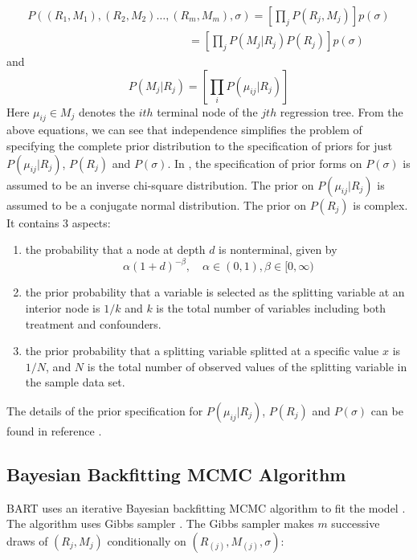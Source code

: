 \begin{equation*}
 \begin{array}{l}
P(({R_1},{M_1}),({R_2},{M_2}) \ldots ,({R_m},{M_m}),\sigma ) = \left[ {\prod\limits_j {P({R_j},{M_j})} } \right]p(\sigma )\\
\quad \quad \quad \quad \quad \quad \quad \quad \quad \quad \quad \quad \quad \quad \; = \left[ {\prod\limits_j {P({M_j}|{R_j})P({R_j})} } \right]p(\sigma )
\end{array}
 \end{equation*}
and
\begin{equation*}
P({M_j}|{R_j}) = \left[ {\prod\limits_i {P({\mu _{ij}}|{R_j})} } \right]
 \end{equation*}
Here ${\mu _{ij}} \in {M_j}$ denotes the $ith$ terminal node of the $jth$ regression tree. From the above equations, we can see that independence simplifies the problem of specifying the complete prior distribution to the specification of priors for just ${P({\mu _{ij}}|{R_j})}$, $P({R_j})$ and $P(\sigma)$. In \cite{chipman2010bart}, the specification of prior forms on $P(\sigma)$ is assumed to be an inverse chi-square distribution. The prior on ${P({\mu _{ij}}|{R_j})}$ is assumed to be a conjugate normal distribution. The prior on $P(R_j)$ is complex. It contains 3 aspects:
\begin{enumerate}
\item the probability that a node at depth $d$ is nonterminal, given by
\begin{equation*}
\alpha {(1 + d)^{ - \beta }},\quad \alpha  \in (0,1),\beta  \in [0,\infty )
 \end{equation*}
\item the prior probability that a variable is selected as the splitting variable at an interior node is $1/k$ and $k$ is the total number of variables including both treatment and confounders.
\item the prior probability that a splitting variable splitted at a specific value $x$ is $1/N$, and $N$ is the total number of observed values of the splitting variable in the sample data set.
\end{enumerate}
The details of the prior specification for ${P({\mu _{ij}}|{R_j})}$, $P({R_j})$ and $P(\sigma)$ can be found in reference \cite{chipman2010bart}.


\subsection{Bayesian Backfitting MCMC Algorithm}
BART uses an iterative Bayesian backfitting  MCMC algorithm to fit the model \cite{gilks2005markov}. The algorithm uses Gibbs sampler \cite{casella1992explaining}. The Gibbs sampler makes $m$ successive draws of $(R_j, M_j)$ conditionally on $(R_{(j)}, M_{(j)}, \sigma)$:

